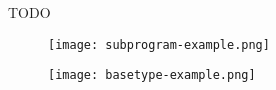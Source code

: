  


TODO

\begin{figure}[h]
    \centering
    \texttt{[image: subprogram-example.png]}
    \label{fig:subprogramexample}
\end{figure}


\begin{figure}[h]
    \centering
    \texttt{[image: basetype-example.png]}
    \label{fig:basetypeexample}
\end{figure}


